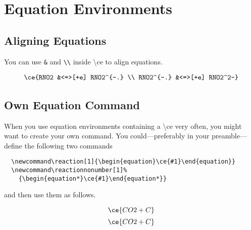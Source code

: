 \documentclass[a4paper,notitlepage,parskip=half]{scrreprt}
\newcommand\macro[1]{\mbox{\ttfamily\textbackslash#1}}
\begin{document}
\begin{Example}[xrightmargin=5cm]
\end{Example}



\section{Equation Environments}

\subsection{Aligning Equations}

You can use \verb|&| and \verb|\\| inside \macro{ce} to align equations.

\begin{SideBySideExample}[xrightmargin=5cm]
  \begin{align*}
    \ce{RNO2 &<=>[+e] RNO2^{-.} \\
         RNO2^{-.} &<=>[+e] RNO2^2-}
  \end{align*}
\end{SideBySideExample}


\subsection{Own Equation Command}

When you use equation environments containing a \macro{ce} very often, you might want to create your own command. You could---preferably in your preamble---define the following two commands

\begin{Verbatim}
  \newcommand\reaction[1]{\begin{equation}\ce{#1}\end{equation}}
  \newcommand\reactionnonumber[1]%
    {\begin{equation*}\ce{#1}\end{equation*}}
\end{Verbatim}

and then use them as follows.

\newcommand\reaction[1]{\begin{equation}\ce{#1}\end{equation}}
\newcommand\reactionnonumber[1]%
  {\begin{equation*}\ce{#1}\end{equation*}}
\begin{SideBySideExample}[xrightmargin=5cm]
  \reaction{CO2 + C}
  \reactionnonumber{CO2 + C}
\end{SideBySideExample}
\end{document}

